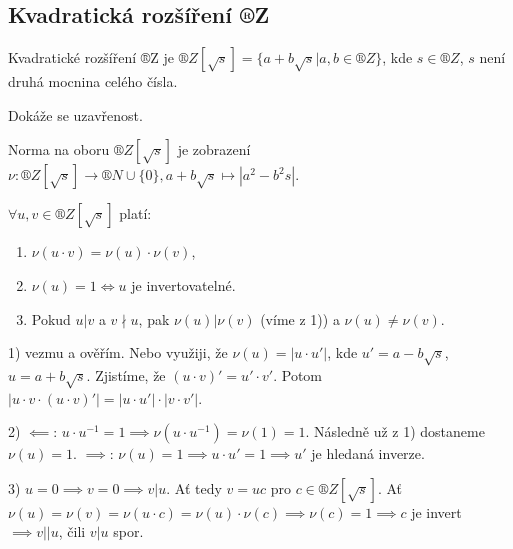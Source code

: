 \documentclass[12pt]{article}                   %
\begin{document}
    \subsection{Kvadratická rozšíření ®Z}
        \begin{definice}
            Kvadratické rozšíření ®Z je $®Z[\sqrt{s}] = \{a + b\sqrt{s}|a, b \in ®Z\}$, kde $s \in ®Z$, $s$ není druhá mocnina celého čísla.
            \begin{dukazin}[Tvar $®Z\[\sqrt{s}\]$]
                Dokáže se uzavřenost.
            \end{dukazin}
        \end{definice}

        \begin{definice}
            Norma na oboru $®Z[\sqrt{s}]$ je zobrazení $\nu : ®Z[\sqrt{s}] \rightarrow ®N \cup \{0\}, a+b\sqrt{s} \mapsto |a^2 - b^2s|$.
        \end{definice}

        \begin{tvrzeni}
            $\forall u, v \in ®Z[\sqrt{s}]$ platí:
            
            \begin{enumerate}
                \item $\nu(u·v) = \nu(u)·\nu(v)$,
                \item $\nu(u) = 1 \Leftrightarrow u$ je invertovatelné.
                \item Pokud $u|v$ a $v \nmid u$, pak $\nu(u)|\nu(v)$ (víme z 1)) a $\nu(u)≠\nu(v)$.
            \end{enumerate}

            \begin{dukazin}
                1) vezmu a ověřím. Nebo využiji, že $\nu(u) = |u·u'|$, kde $u' = a - b\sqrt{s}$, $u = a + b\sqrt{s}$. Zjistíme, že $(u·v)' = u'·v'$. Potom $|u·v·(u·v)'| = |u·u'|·|v·v'|$.

                2) $\impliedby$: $u·u^{-1} = 1 \implies \nu(u·u^{-1}) = \nu(1) = 1$. Následně už z 1) dostaneme $\nu(u) = 1$. $\implies$: $\nu(u) = 1 \implies u·u' = 1 \implies u'$ je hledaná inverze.

                3) $u = 0 \implies v = 0 \implies v|u$. Ať tedy $v = uc$ pro $c \in ®Z[\sqrt{s}]$. Ať $\nu(u) = \nu(v) = \nu(u·c) = \nu(u)·\nu(c) \implies \nu(c) = 1 \implies c$ je invert $\implies v||u$, čili $v|u$ spor.
            \end{dukazin}
        \end{tvrzeni}
\end{document}
